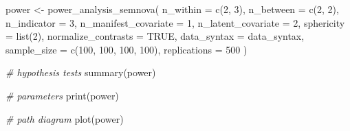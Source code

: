 \documentclass[
]{book}
\newenvironment{Shaded}{\begin{snugshade}}{\end{snugshade}}
\newcommand{\AttributeTok}[1]{\textcolor[rgb]{0.77,0.63,0.00}{#1}}
\newcommand{\CommentTok}[1]{\textcolor[rgb]{0.56,0.35,0.01}{\textit{#1}}}
\newcommand{\ConstantTok}[1]{\textcolor[rgb]{0.00,0.00,0.00}{#1}}
\newcommand{\DecValTok}[1]{\textcolor[rgb]{0.00,0.00,0.81}{#1}}
\newcommand{\FunctionTok}[1]{\textcolor[rgb]{0.00,0.00,0.00}{#1}}
\newcommand{\NormalTok}[1]{#1}
\newcommand{\OtherTok}[1]{\textcolor[rgb]{0.56,0.35,0.01}{#1}}
\begin{document}
\begin{Shaded}
\begin{Highlighting}[]
\NormalTok{power }\OtherTok{\textless{}{-}} \FunctionTok{power\_analysis\_semnova}\NormalTok{(}
    \AttributeTok{n\_within =} \FunctionTok{c}\NormalTok{(}\DecValTok{2}\NormalTok{, }\DecValTok{3}\NormalTok{),}
    \AttributeTok{n\_between =} \FunctionTok{c}\NormalTok{(}\DecValTok{2}\NormalTok{, }\DecValTok{2}\NormalTok{),}
    \AttributeTok{n\_indicator =} \DecValTok{3}\NormalTok{,}
    \AttributeTok{n\_manifest\_covariate =} \DecValTok{1}\NormalTok{,}
    \AttributeTok{n\_latent\_covariate =} \DecValTok{2}\NormalTok{,}
    \AttributeTok{sphericity =} \FunctionTok{list}\NormalTok{(}\DecValTok{2}\NormalTok{),}
    \AttributeTok{normalize\_contrasts =} \ConstantTok{TRUE}\NormalTok{,}
    \AttributeTok{data\_syntax =}\NormalTok{ data\_syntax,}
    \AttributeTok{sample\_size =} \FunctionTok{c}\NormalTok{(}\DecValTok{100}\NormalTok{, }\DecValTok{100}\NormalTok{, }\DecValTok{100}\NormalTok{, }\DecValTok{100}\NormalTok{),}
    \AttributeTok{replications =} \DecValTok{500}
\NormalTok{)}

\CommentTok{\# hypothesis tests}
\FunctionTok{summary}\NormalTok{(power)}

\CommentTok{\# parameters}
\FunctionTok{print}\NormalTok{(power)}

\CommentTok{\# path diagram}
\FunctionTok{plot}\NormalTok{(power)}
\end{Highlighting}
\end{Shaded}


  
\end{document}
